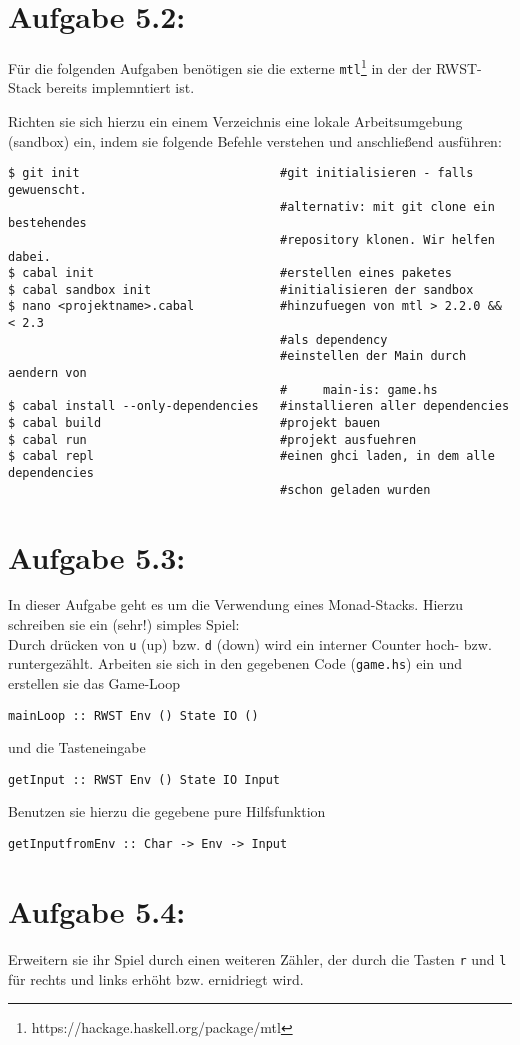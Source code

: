 \documentclass[a4paper,10pt]{scrartcl}
\newcommand{\theuebungszettel}{5}
\begin{document}
\section*{Aufgabe \theuebungszettel.2:}
Für die folgenden Aufgaben benötigen sie die externe \texttt{mtl}\footnote{https://hackage.haskell.org/package/mtl} in der der RWST-Stack bereits implemntiert ist.\\\par
Richten sie sich hierzu ein einem Verzeichnis eine lokale Arbeitsumgebung (sandbox) ein, indem sie folgende Befehle verstehen und anschließend ausführen:
\begin{verbatim}
$ git init                            #git initialisieren - falls gewuenscht.
                                      #alternativ: mit git clone ein bestehendes
                                      #repository klonen. Wir helfen dabei.
$ cabal init                          #erstellen eines paketes
$ cabal sandbox init                  #initialisieren der sandbox
$ nano <projektname>.cabal            #hinzufuegen von mtl > 2.2.0 && < 2.3
                                      #als dependency
                                      #einstellen der Main durch aendern von
                                      #     main-is: game.hs
$ cabal install --only-dependencies   #installieren aller dependencies
$ cabal build                         #projekt bauen
$ cabal run                           #projekt ausfuehren
$ cabal repl                          #einen ghci laden, in dem alle dependencies
                                      #schon geladen wurden
\end{verbatim}

\section*{Aufgabe \theuebungszettel.3:}
In dieser Aufgabe geht es um die Verwendung eines Monad-Stacks. Hierzu schreiben sie ein (sehr!) simples Spiel:\\
Durch drücken von \texttt{u} (up) bzw. \texttt{d} (down) wird ein interner Counter hoch- bzw. runtergezählt. Arbeiten sie sich in den gegebenen Code (\texttt{game.hs}) ein und erstellen sie das Game-Loop
\begin{verbatim}
mainLoop :: RWST Env () State IO ()
\end{verbatim}
und die Tasteneingabe
\begin{verbatim}
getInput :: RWST Env () State IO Input
\end{verbatim}
Benutzen sie hierzu die gegebene pure Hilfsfunktion
\begin{verbatim}
getInputfromEnv :: Char -> Env -> Input
\end{verbatim}
\section*{Aufgabe \theuebungszettel.4:}
Erweitern sie ihr Spiel durch einen weiteren Zähler, der durch die Tasten \texttt{r} und \texttt{l} für rechts und links erhöht bzw. ernidriegt wird.
\end{document}
